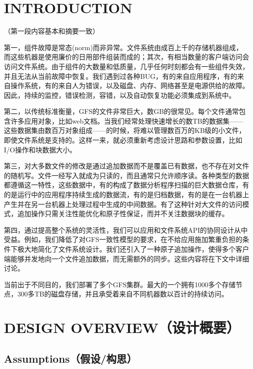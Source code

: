\documentclass{article}
\begin{document}
\section{INTRODUCTION}
（第一段内容基本和摘要一致）\par
第一，组件故障是常态(norm)而非异常。文件系统由成百上千的存储机器组成，而这些机器是使用廉价的日用部件组装而成的；其次，有相当数量的客户端访问会访问文件系统。由于组件的大数量和低质量，几乎任何时刻都会有一些组件失效，并且无法从当前故障中恢复。我们遇到过各种BUG，有的来自应用程序，有的来自操作系统，有的来自人为错误，以及磁盘、内存、网络甚至是电源供给的故障。因此，持续的监控，错误检测，容错，以及自动恢复功能必须集成到系统中。\par
第二，以传统标准衡量，GFS的文件非常巨大，数GB的很常见。每个文件通常包含许多应用对象，比如web文档。当我们经常处理快速增长的数TB的数据集——这些数据集由数百万对象组成——的时候，将难以管理数百万的KB级的小文件，即使文件系统是支持的。这样一来，就必须重新考虑设计思路和参数设置，比如I/O操作和块数据大小。\par
第三，对大多数文件的修改是通过追加数据而不是覆盖已有数据，也不存在对文件的随机写。文件一经写入就成为只读的，而且通常只允许顺序读。各种类型的数据都遵循这一特性，这些数据中，有的构成了数据分析程序扫描的巨大数据仓库，有的是运行中的应用程序持续生成的数据流，有的是归档数据，有的是在一台机器上产生并在另一台机器上处理过程中生成的中间数据。有了这种针对大文件的访问模式，追加操作只需关注性能优化和原子性保证，而并不关注数据块的缓存。\par
第四，通过提高整个系统的灵活性，我们可以应用和文件系统API的协同设计从中受益。例如，我们降低了对GFS一致性模型的要求，在不给应用施加繁重负担的条件下极大地简化了文件系统设计。我们还引入了一种原子追加操作，使得多个客户端能够并发地向一个文件追加数据，而无需额外的同步。这些内容将在下文中详细讨论。\par
当前出于不同目的，我们部署了多个GFS集群。最大的一个拥有1000多个存储节点，300多TB的磁盘存储，并且承受着来自不同机器数以百计的持续访问。

\section{DESIGN OVERVIEW（设计概要）}
\subsection{Assumptions（假设/构思）}
\end{document}
